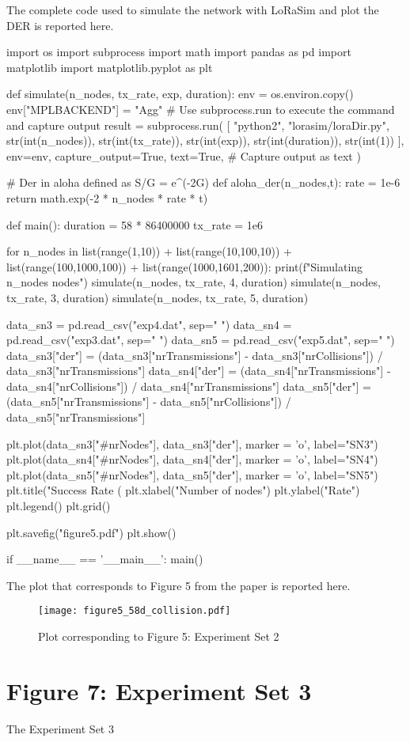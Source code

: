The complete code used to simulate the network with LoRaSim and plot the DER is reported here.
\begin{python}
import os
import subprocess
import math
import pandas as pd
import matplotlib
import matplotlib.pyplot as plt

def simulate(n_nodes, tx_rate, exp, duration):
    env = os.environ.copy()
    env["MPLBACKEND"] = "Agg"
    # Use subprocess.run to execute the command and capture output
    result = subprocess.run(
        [
            "python2",
            "lorasim/loraDir.py",
            str(int(n_nodes)),
            str(int(tx_rate)),
            str(int(exp)),
            str(int(duration)),
            str(int(1))
        ],
        env=env,
        capture_output=True,
        text=True,  # Capture output as text
    )

# Der in aloha defined as S/G = e^(-2G)
def aloha_der(n_nodes,t):
    rate = 1e-6
    return math.exp(-2 * n_nodes * rate * t)

def main():
    duration = 58 * 86400000
    tx_rate = 1e6

    for n_nodes in list(range(1,10)) + list(range(10,100,10)) + list(range(100,1000,100)) + list(range(1000,1601,200)):
        print(f"Simulating {n_nodes} nodes")
        simulate(n_nodes, tx_rate, 4, duration)
        simulate(n_nodes, tx_rate, 3, duration)
        simulate(n_nodes, tx_rate, 5, duration)

    data_sn3 = pd.read_csv("exp4.dat", sep=" ")
    data_sn4 = pd.read_csv("exp3.dat", sep=" ")
    data_sn5 = pd.read_csv("exp5.dat", sep=" ")
    data_sn3["der"] = (data_sn3["nrTransmissions"] - data_sn3["nrCollisions"]) / data_sn3["nrTransmissions"]
    data_sn4["der"] = (data_sn4["nrTransmissions"] - data_sn4["nrCollisions"]) / data_sn4["nrTransmissions"]
    data_sn5["der"] = (data_sn5["nrTransmissions"] - data_sn5["nrCollisions"]) / data_sn5["nrTransmissions"]
    
    plt.plot(data_sn3["#nrNodes"], data_sn3["der"], marker = 'o', label="SN3")
    plt.plot(data_sn4["#nrNodes"], data_sn4["der"], marker = 'o', label="SN4")
    plt.plot(data_sn5["#nrNodes"], data_sn5["der"], marker = 'o', label="SN5")
    plt.title("Success Rate (%
    plt.xlabel("Number of nodes")
    plt.ylabel("Rate")
    plt.legend()
    plt.grid()

    plt.savefig("figure5.pdf")
    plt.show()

if __name__ == '__main__':
    main()
\end{python}

The plot that corresponds to Figure 5 from the paper is reported here.

\begin{figure}[H]
    \centering
    \texttt{[image: figure5\_58d\_collision.pdf]}
    \caption{Plot corresponding to Figure 5: Experiment Set 2}
\end{figure}

\section{Figure 7: Experiment Set 3}
The Experiment Set 3 


